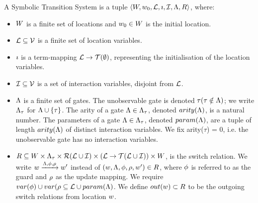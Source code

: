\begin{definition}
A Symbolic Transition System is a tuple $\langle W,w_0,\mathcal{L},\imath,\mathcal{I},\Lambda,R\rangle$, where:
\begin{itemize}
\item $W$ is a finite set of locations and $w_0 \in W$ is the initial location.
\item $\mathcal{L} \subseteq \mathcal{V}$ is a finite set of location variables.
\item $\imath$ is a term-mapping $\mathcal{L} \rightarrow \mathcal{T}(\emptyset)$, representing the initialisation of the location variables.
\item $\mathcal{I} \subseteq \mathcal{V}$ is a set of interaction variables, disjoint from $\mathcal{L}$.
\item $\Lambda$ is a finite set of gates. The unobservable gate is denoted $\tau (\tau \notin \Lambda)$; we write $\Lambda_\tau$ for $\Lambda \cup \{\tau\}$. The arity of a gate $\Lambda\in\Lambda_\tau$, denoted $arity(\Lambda)$, is a natural number. The parameters of a gate $\Lambda\in\Lambda_\tau$, denoted $param(\Lambda)$, are a tuple of length $arity(\Lambda)$ of distinct interaction variables. We fix arity($\tau$) = 0, i.e. the unobservable gate has no interaction variables.
\item $R \subseteq W \times \Lambda_\tau \times \mathcal{R}(\mathcal{L} \cup \mathcal{I}) \times (\mathcal{L} \rightarrow \mathcal{T}(\mathcal{L} \cup \mathcal{I})) \times W$, is the switch relation. We write $w\xrightarrow{\Lambda,\phi,\rho}w'$ instead of $(w,\Lambda,\phi,\rho,w')\in R$, where $\phi$ is referred to as the guard and $\rho$ as the update mapping. We require $var(\phi) \cup var(\rho \subseteq \mathcal{L} \cup param(\Lambda)$. We define $out(w) \subset R$ to be the outgoing switch relations from location $w$.
\end{itemize}
\end{definition}

